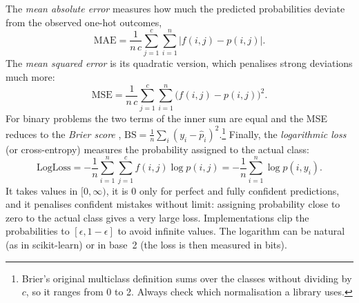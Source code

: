 The \emph{mean absolute error} measures how much the predicted probabilities deviate from the
observed one-hot outcomes,
\begin{equation}
  \mathrm{MAE}=\frac{1}{n\,c}\sum_{j=1}^{c}\sum_{i=1}^{n}\bigl|f(i,j)-p(i,j)\bigr|.
\end{equation}
The \emph{mean squared error} is its quadratic version, which penalises strong deviations
much more:
\begin{equation}
  \mathrm{MSE}=\frac{1}{n\,c}\sum_{j=1}^{c}\sum_{i=1}^{n}\bigl(f(i,j)-p(i,j)\bigr)^2.
\end{equation}
For binary problems the two terms of the inner sum are equal and the MSE reduces to the
\emph{Brier score} \citep{brier1950verification},
$\mathrm{BS}=\frac1n\sum_i(y_i-\hat p_i)^2$.\footnote{Brier's original multiclass definition
sums over the classes without dividing by $c$, so it ranges from 0 to 2. Always check which
normalisation a library uses.}
Finally, the \emph{logarithmic loss} (or cross-entropy) measures the probability assigned to
the actual class:
\begin{equation}
  \mathrm{LogLoss}=-\frac1n\sum_{i=1}^{n}\sum_{j=1}^{c}f(i,j)\log p(i,j)
                 =-\frac1n\sum_{i=1}^{n}\log p(i,y_i).
\end{equation}
It takes values in $[0,\infty)$, it is 0 only for perfect and fully confident predictions, and
it penalises confident mistakes without limit: assigning probability close to zero to the
actual class gives a very large loss. Implementations clip the probabilities to
$[\epsilon,1-\epsilon]$ to avoid infinite values. The logarithm can be natural (as in
scikit-learn) or in base~2 (the loss is then measured in bits).

